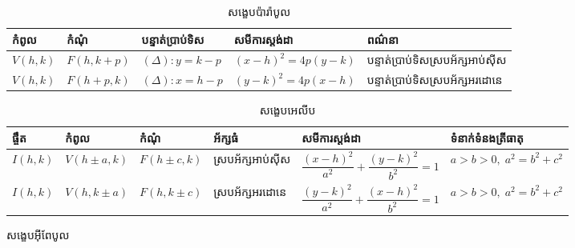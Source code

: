 \clearpage
\begin{landscape}
	\begin{table}[H]
		\centering%
		\renewcommand{\arraystretch}{1.5}%
		\caption{សង្ខេបប៉ារ៉ាបូល}
		\begin{adjustbox}{width=\linewidth}
			\begin{tabular}{|l|l|l|l|l|}
				\arrayrulecolor{magenta}%
				\hline
				កំពូល & កំណុំ & បន្ទាត់ប្រាប់ទិស & សមីការស្ដង់ដា & ពណ៌នា\\
				\hline
				$ V(h,k) $ & $ F(h,k+p) $ & $ (\Delta): y=k-p $ & $ (x-h)^2=4p(y-k) $ & បន្ទាត់ប្រាប់ទិសស្របអ័ក្សអាប់ស៊ីស \\
				\hline
				$ V(h,k) $ & $ F(h+p,k) $ & $ (\Delta): x=h-p $ & $ (y-k)^2=4p(x-h) $ & បន្ទាត់ប្រាប់ទិសស្របអ័ក្សអរដោនេ \\
				\hline
			\end{tabular}
		\end{adjustbox}
	\end{table}
	\begin{table}[H]
		\centering%
		\renewcommand{\arraystretch}{1.5}%
		\caption{សង្ខេបអេលីប}
		\begin{adjustbox}{width=\linewidth}
			\begin{tabular}{|l|l|l|l|l|l|}
				\arrayrulecolor{magenta}%
				\hline
				ផ្ចឹត & កំពូល & កំណុំ & អ័ក្សធំ & សមីការស្ដង់ដា & ទំនាក់ទំនងត្រីធាតុ \\
				\hline
				$ I(h,k) $ & $ V(h\pm a,k) $ & $ F(h\pm c,k) $ & ស្របអ័ក្សអាប់ស៊ីស & $ \dfrac{(x-h)^2}{a^2}+\dfrac{(y-k)^2}{b^2}=1 $ & $ a>b>0,\; a^2=b^2+c^2 $\\
				\hline
				$ I(h,k) $ & $ V(h,k\pm a) $ & $ F(h,k\pm c) $ & ស្របអ័ក្សអរដោនេ & $ \dfrac{(y-k)^2}{a^2}+\dfrac{(x-h)^2}{b^2}=1 $ & $ a>b>0,\; a^2=b^2+c^2 $\\
				\hline
			\end{tabular}
		\end{adjustbox}
	\end{table}
	\begin{table}[H]
		\centering%
		\renewcommand{\arraystretch}{1.5}%
		\caption{សង្ខេបអ៊ីពែបូល}
		\begin{adjustbox}{width=\linewidth}

\end{adjustbox}
\end{table}
\end{landscape}
